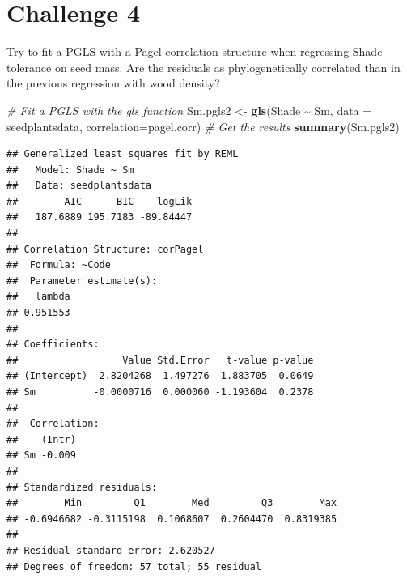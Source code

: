 \documentclass[
]{book}
\newenvironment{Shaded}{\begin{snugshade}}{\end{snugshade}}
\newcommand{\AttributeTok}[1]{\textcolor[rgb]{0.13,0.29,0.53}{#1}}
\newcommand{\CommentTok}[1]{\textcolor[rgb]{0.56,0.35,0.01}{\textit{#1}}}
\newcommand{\FunctionTok}[1]{\textcolor[rgb]{0.13,0.29,0.53}{\textbf{#1}}}
\newcommand{\NormalTok}[1]{#1}
\newcommand{\OtherTok}[1]{\textcolor[rgb]{0.56,0.35,0.01}{#1}}
\newcommand{\SpecialCharTok}[1]{\textcolor[rgb]{0.81,0.36,0.00}{\textbf{#1}}}
\begin{document}
\section{Challenge 4}\label{challenge-4-1}

Try to fit a PGLS with a Pagel correlation structure when regressing Shade tolerance on seed mass. Are the residuals as phylogenetically correlated than in the previous regression with wood density?

\begin{Shaded}
\begin{Highlighting}[]
\CommentTok{\# Fit a PGLS with the gls function}
\NormalTok{Sm.pgls2 }\OtherTok{\textless{}{-}} \FunctionTok{gls}\NormalTok{(Shade }\SpecialCharTok{\textasciitilde{}}\NormalTok{ Sm, }\AttributeTok{data =}\NormalTok{ seedplantsdata, }\AttributeTok{correlation=}\NormalTok{pagel.corr)}
\CommentTok{\# Get the results}
\FunctionTok{summary}\NormalTok{(Sm.pgls2)}
\end{Highlighting}
\end{Shaded}

\begin{verbatim}
## Generalized least squares fit by REML
##   Model: Shade ~ Sm 
##   Data: seedplantsdata 
##        AIC      BIC    logLik
##   187.6889 195.7183 -89.84447
## 
## Correlation Structure: corPagel
##  Formula: ~Code 
##  Parameter estimate(s):
##   lambda 
## 0.951553 
## 
## Coefficients:
##                  Value Std.Error   t-value p-value
## (Intercept)  2.8204268  1.497276  1.883705  0.0649
## Sm          -0.0000716  0.000060 -1.193604  0.2378
## 
##  Correlation: 
##    (Intr)
## Sm -0.009
## 
## Standardized residuals:
##        Min         Q1        Med         Q3        Max 
## -0.6946682 -0.3115198  0.1068607  0.2604470  0.8319385 
## 
## Residual standard error: 2.620527 
## Degrees of freedom: 57 total; 55 residual
\end{verbatim}


\end{document}

